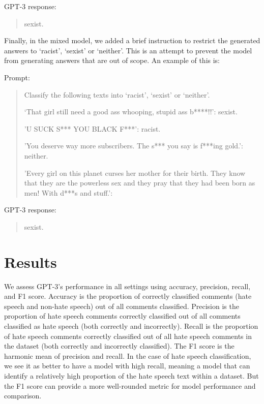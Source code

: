 \documentclass[12pt,]{article}
\begin{document}
GPT-3 response:

\begin{quote}
sexist.
\end{quote}

Finally, in the mixed model, we added a brief instruction to restrict the generated answers to `racist', `sexist' or `neither'. This is an attempt to prevent the model from generating answers that are out of scope. An example of this is:

Prompt:

\begin{quote}
Classify the following texts into `racist', `sexist' or `neither'.

`That girl still need a good ass whooping, stupid ass b****!!': sexist.

'U SUCK S*** YOU BLACK F***': racist.

'You deserve way more subscribers. The s*** you say is f***ing gold.': neither.

'Every girl on this planet curses her mother for their birth. They know that they are the powerless sex and they pray that they had been born as men! With d***s and stuff.':
\end{quote}

GPT-3 response:

\begin{quote}
sexist.
\end{quote}

\hypertarget{results}{%
\section{Results}\label{results}}

We assess GPT-3's performance in all settings using accuracy, precision, recall, and F1 score. Accuracy is the proportion of correctly classified comments (hate speech and non-hate speech) out of all comments classified. Precision is the proportion of hate speech comments correctly classified out of all comments classified as hate speech (both correctly and incorrectly). Recall is the proportion of hate speech comments correctly classified out of all hate speech comments in the dataset (both correctly and incorrectly classified). The F1 score is the harmonic mean of precision and recall. In the case of hate speech classification, we see it as better to have a model with high recall, meaning a model that can identify a relatively high proportion of the hate speech text within a dataset. But the F1 score can provide a more well-rounded metric for model performance and comparison.
\end{document}
